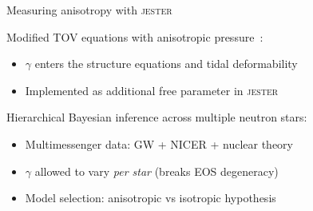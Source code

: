 \documentclass[usenames,dvipsnames,t]{beamer}
\begin{document}
\begin{frame}{Measuring anisotropy with \textsc{jester}}

  \def\x{3mm}
  \def\y{1mm}

  Modified TOV equations with anisotropic pressure~:
  \begin{itemize}
    \vspace{\y}
    \item $\gamma$ enters the structure equations and tidal deformability
    \vspace{\y}
    \item Implemented as additional free parameter in \textsc{jester}
  \end{itemize}

  \pause
  \vspace{\x}

  Hierarchical Bayesian inference across multiple neutron stars:
  \begin{itemize}
    \vspace{\y}
    \item Multimessenger data: GW + NICER + nuclear theory
    \vspace{\y}
    \item $\gamma$ allowed to vary \emph{per star} (breaks EOS degeneracy)
    \vspace{\y}
    \item Model selection: anisotropic vs isotropic hypothesis
  \end{itemize}

\end{frame}
\end{document}
